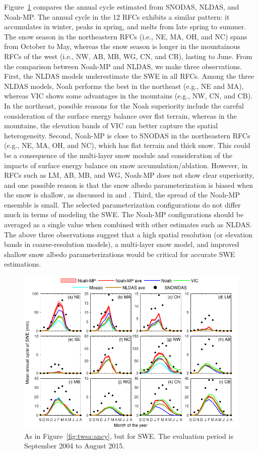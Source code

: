 \documentclass[essd, manuscript]{copernicus}
\begin{document}
Figure~\ref{fig:swe:ancy} compares the annual cycle estimated from SNODAS, NLDAS, and Noah-MP. The annual cycle in the 12 RFCs exhibits a similar pattern: it accumulates in winter, peaks in spring, and melts from late spring to summer. The snow season in the northeastern RFCs (i.e., NE, MA, OH, and NC) spans from October to May, whereas the snow season is longer in the mountainous RFCs of the west (i.e., NW, AB, MB, WG, CN, and CB), lasting to June. From the comparison between Noah-MP and NLDAS, we make three observations. First, the NLDAS models underestimate the SWE in all RFCs. Among the three NLDAS models, Noah performs the best in the northeast (e.g., NE and MA), whereas VIC shows some advantages in the mountains (e.g., NW, CN, and CB). In the northeast, possible reasons for the Noah superiority include the careful consideration of the surface energy balance over flat terrain, whereas in the mountains, the elevation bands of VIC can better capture the spatial heterogeneity. Second, Noah-MP is close to SNODAS in the northeastern RFCs (e.g., NE, MA, OH, and NC), which has flat terrain and thick snow. This could be a consequence of the multi-layer snow module \citep{niu2011JGRA} and consideration of the impacts of surface energy balance on snow accumulation/ablation. However, in RFCs such as LM, AB, MB, and WG, Noah-MP does not show clear superiority, and one possible reason is that the snow albedo parameterization is biased when the snow is shallow, as discussed in \citet{dang2019TC} and \citet{wang2020JHd}. Third, the spread of the Noah-MP ensemble is small. The selected parameterization configurations do not differ much in terms of modeling the SWE. The Noah-MP configurations should be averaged as a single value when combined with other estimates such as NLDAS. The above three observations suggest that a high spatial resolution (or elevation bands in coarse-resolution models), a multi-layer snow model, and improved shallow snow albedo parameterizations would be critical for accurate SWE estimations.

\begin{figure}[t]
  \includegraphics[width=12cm]{fig/fig08.pdf}
  \caption{As in Figure~\ref{fig:twsa:ancy}, but for SWE. The evaluation period is September 2004 to August 2015.}
  \label{fig:swe:ancy}
\end{figure}
\end{document}
